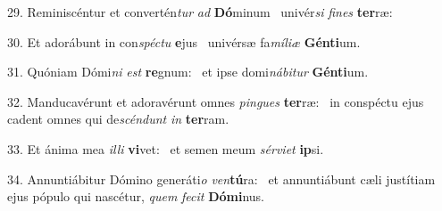 29. Reminiscéntur et convertén\textit{tur} \textit{ad} \textbf{Dó}minum \ast\  univér\textit{si} \textit{fi}\textit{nes} \textbf{ter}ræ:\

30. Et adorábunt in con\textit{spéc}\textit{tu} \textbf{e}jus \ast\  univérsæ fa\textit{mí}\textit{li}\textit{æ} \textbf{Gén}\textbf{ti}um.\

31. Quóniam Dómi\textit{ni} \textit{est} \textbf{re}gnum: \ast\  et ipse domi\textit{ná}\textit{bi}\textit{tur} \textbf{Gén}\textbf{ti}um.\

32. Manducavérunt et adoravérunt omnes \textit{pin}\textit{gues} \textbf{ter}ræ: \ast\  in conspéctu ejus cadent omnes qui de\textit{scén}\textit{dunt} \textit{in} \textbf{ter}ram.\

33. Et ánima mea \textit{il}\textit{li} \textbf{vi}vet: \ast\  et semen meum \textit{sér}\textit{vi}\textit{et} \textbf{ip}si.\

34. Annuntiábitur Dómino generáti\textit{o} \textit{ven}\textbf{tú}ra: \ast\  et annuntiábunt cæli justítiam ejus pópulo qui nascétur, \textit{quem} \textit{fe}\textit{cit} \textbf{Dó}\textbf{mi}nus.\

